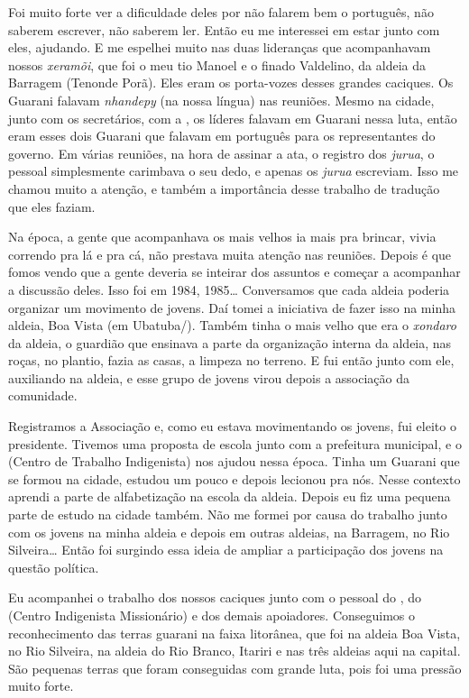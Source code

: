 Foi muito forte ver a dificuldade deles por não falarem bem o português,
não saberem escrever, não saberem ler. Então eu me interessei em estar
junto com eles, ajudando. E me espelhei muito nas duas lideranças que
acompanhavam nossos \emph{xeramõi}, que foi o meu tio Manoel e o finado
Valdelino, da aldeia da Barragem (Tenonde Porã). Eles eram os
porta-vozes desses grandes caciques. Os Guarani falavam \emph{nhandepy} (na
nossa língua) nas reuniões. Mesmo na cidade, junto com os secretários,
com a , os líderes falavam em Guarani nessa luta, então eram esses
dois Guarani que falavam em português para os representantes do
governo. Em várias reuniões, na hora de assinar a ata, o registro dos
\emph{jurua}, o pessoal simplesmente carimbava o seu dedo, e apenas os \emph{jurua}
escreviam. Isso me chamou muito a atenção, e também a importância desse
trabalho de tradução que eles faziam.

Na época, a gente que acompanhava os mais velhos ia mais pra brincar,
vivia correndo pra lá e pra cá, não prestava muita atenção nas
reuniões. Depois é que fomos vendo que a gente deveria se inteirar dos
assuntos e começar a acompanhar a discussão deles. Isso foi em 1984,
1985\ldots{} Conversamos que cada aldeia poderia organizar um movimento de
jovens. Daí tomei a iniciativa de fazer isso na minha aldeia, Boa Vista
(em Ubatuba/). Também tinha o mais velho que era o \emph{xondaro} da aldeia,
o guardião que ensinava a parte da organização interna da aldeia, nas
roças, no plantio, fazia as casas, a limpeza no terreno. E fui então
junto com ele, auxiliando na aldeia, e esse grupo de jovens virou
depois a associação da comunidade.

Registramos a Associação e, como eu estava movimentando os jovens, fui
eleito o presidente. Tivemos uma proposta de escola junto com a
prefeitura municipal, e o  (Centro de Trabalho Indigenista) nos
ajudou nessa época. Tinha um Guarani que se formou na cidade, estudou
um pouco e depois lecionou pra nós. Nesse contexto aprendi a parte de
alfabetização na escola da aldeia. Depois eu fiz uma pequena parte de
estudo na cidade também. Não me formei por causa do trabalho junto com
os jovens na minha aldeia e depois em outras aldeias, na Barragem, no
Rio Silveira\ldots{} Então foi surgindo essa ideia de ampliar a participação
dos jovens na questão política.

Eu acompanhei o trabalho dos nossos caciques junto com o pessoal do ,
do  (Centro Indigenista Missionário) e dos demais apoiadores.
Conseguimos o reconhecimento das terras guarani na faixa litorânea, que
foi na aldeia Boa Vista, no Rio Silveira, na aldeia do Rio Branco,
Itariri e nas três aldeias aqui na capital. São pequenas terras que
foram conseguidas com grande luta, pois foi uma pressão muito forte. 

